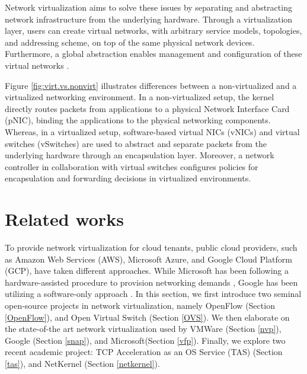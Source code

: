 Network virtualization aims to solve these issues by separating and abstracting 
network infrastructure from the underlying hardware.
Through a virtualization layer, users can create virtual networks, with arbitrary service 
models, topologies, and addressing scheme, on top of the same physical network devices. Furthermore, 
a global abstraction enables management and configuration of these virtual networks 
\cite{mckeown2008openflow}.

Figure \ref{fig:virt.vs.nonvirt} illustrates differences between a non-virtualized and a
virtualized networking environment. In a non-virtualized setup, the kernel directly routes 
packets from applications to a physical Network Interface Card (pNIC), binding the applications 
to the physical networking components. Whereas, in a virtualized setup, software-based virtual NICs (vNICs) 
and virtual switches (vSwitches) are used to abstract and separate packets from the underlying hardware through an 
encapsulation layer. Moreover, a network controller in collaboration with virtual switches configures
policies for encapsulation and forwarding decisions in virtualized environments.

\section{Related works}
\label{sec:network.virt.platform}

To provide network virtualization for cloud tenants, public cloud providers, such as Amazon 
Web Services (AWS), Microsoft Azure, and Google Cloud Platform (GCP), have taken different 
approaches. While Microsoft has been following a hardware-assisted procedure to provision 
networking demands \cite{firestone2018azure, firestone2017vfp}, Google has been utilizing 
a software-only approach \cite{marty2019snap}. In this section, we first introduce two seminal 
open-source projects in network virtualization, namely OpenFlow (Section \ref{OpenFlow}), 
and Open Virtual Switch (Section \ref{OVS}). We then elaborate on the state-of-the art network 
virtualization used by VMWare (Section \ref{nvp}), Google (Section \ref{snap}), and 
Microsoft(Section \ref{vfp}). Finally, we explore two recent academic project:
TCP Acceleration as an OS Service (TAS) (Section \ref{tas}), and NetKernel (Section \ref{netkernel}).


